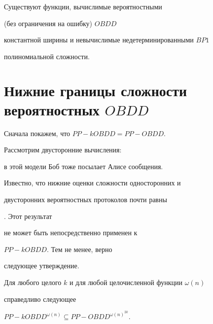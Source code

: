 \begin{cor}


Существуют функции, вычислимые вероятностными


(без ограничения на ошибку) $OBDD$


константной ширины и невычислимые недетерминированными $BP1$


полиномиальной сложности.


\end{cor}








\section{Нижние границы сложности вероятностных $OBDD$}





Сначала покажем, что $PP{-}kOBDD=PP{-}OBDD$.


Рассмотрим двусторонние вычисления:


в этой модели Боб тоже посылает Алисе сообщения.


Известно, что нижние оценки сложности односторонних и


двусторонних вероятностных протоколов почти равны


\cite{PS86}. Этот результат


не может быть непосредственно применен к


$PP{-}kOBDD$. Тем не менее, верно


следующее утверждение.








\begin{thm}


Для любого целого $k$ и для любой целочисленной функции $\omega(n)$


справедливо следующее


$PP{-}kOBDD^{\omega (n)} \subseteq PP{-}OBDD^{\omega(n)^{2k}}$.


\end{thm}








